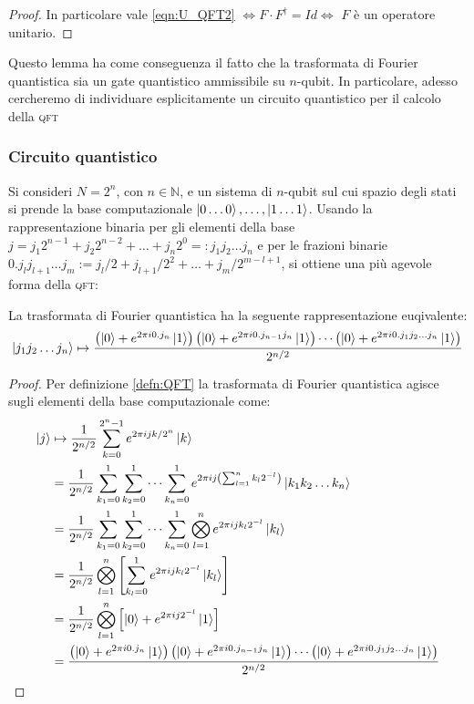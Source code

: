 \begin{proof}
 In particolare vale \eqref{eqn:U_QFT2} $\iff F \cdot F^\dag = Id \iff$ $F$ è un operatore unitario.
\end{proof}

Questo lemma ha come conseguenza il fatto che la trasformata di Fourier quantistica sia un gate quantistico ammissibile su $n$-qubit.
In particolare, adesso cercheremo di individuare esplicitamente un circuito quantistico per il calcolo della \textsc{qft}

\subsubsection{Circuito quantistico}
Si consideri $N = 2^n$, con $n \in \mathbb{N}$, e un sistema di $n$-qubit sul cui spazio degli stati si prende la base computazionale $\ket{0 \dots 0}, \dotsc, \ket{1 \dots 1}$. 
Usando la rappresentazione binaria per gli elementi della base $j = j_1 2^{n-1} + j_2 2^{n-2} + \dots + j_n 2^0 =: j_1j_2 \dots j_n$ e per le frazioni binarie $0.j_lj_{l+1} \dots j_m := j_l/2 + j_{l+1}/2^2 + \dots + j_m/2^{m-l+1}$, si ottiene una più agevole forma della \textsc{qft}:

\begin{lem}
 La trasformata di Fourier quantistica ha la seguente rappresentazione euqivalente:
 \begin{equation}\label{lem:QFT_PR}
 \ket{j_1j_2 \dots j_n} \mapsto \frac{\left( \ket{0} + e^{2 \pi i 0.j_n} \ket{1} \right) \left( \ket{0} + e^{2 \pi i 0.j_{n-1}j_n} \ket{1} \right) \dotsm \left( \ket{0} + e^{2 \pi i 0.j_1j_2 \dots j_n} \ket{1} \right)}{2^{n/2}}
\end{equation}
\end{lem}
\begin{proof}
 Per definizione \eqref{defn:QFT} la trasformata di Fourier quantistica agisce sugli elementi della base computazionale come:
 \begin{align*}
  \ket{j} &\mapsto \frac{1}{2^{n/2}} \sum_{k=0}^{2^n-1} e^{2 \pi i j k/2^n} \ket{k}\\
  & = \frac{1}{2^{n/2}} \sum_{k_1=0}^1 \sum_{k_2=0}^1 \dots \sum_{k_n=0}^1 e^{2 \pi i j \left( \sum_{l=1}^n k_l 2^{-l} \right)} \ket{k_1k_2 \dots k_n}\\
  & = \frac{1}{2^{n/2}} \sum_{k_1=0}^1 \sum_{k_2=0}^1 \dots \sum_{k_n=0}^1 \bigotimes_{l=1}^n e^{2 \pi i j k_l 2^{-l} } \ket{k_l}\\
  & = \frac{1}{2^{n/2}} \bigotimes_{l=1}^n \left[ \sum_{k_l=0}^1 e^{2 \pi i j k_l 2^{-l} } \ket{k_l} \right]\\
  & = \frac{1}{2^{n/2}} \bigotimes_{l=1}^n \left[ \ket{0} + e^{2 \pi i j 2^{-l} } \ket{1} \right]\\
  & = \frac{\left( \ket{0} + e^{2 \pi i 0.j_n} \ket{1} \right) \left( \ket{0} + e^{2 \pi i 0.j_{n-1}j_n} \ket{1} \right) \cdots \left( \ket{0} + e^{2 \pi i 0.j_1j_2 \dots j_n} \ket{1} \right)}{2^{n/2}}
 \end{align*}
\end{proof}


